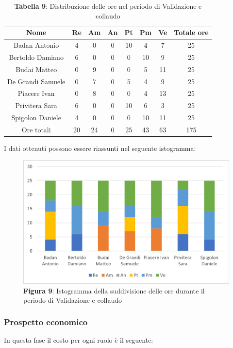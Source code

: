\begin{table}[H]
	\centering
	\renewcommand{\arraystretch}{1.5}
	\begin{tabular}{|c|c|c|c|c|c|c|c|}
		\hline
		\rowcolor{lighter-grayer}
		Nome & Re & Am & An & Pt & Pm & Ve & Totale ore\\
		\hline
		Badan Antonio & 4 & 0 & 0 &  10 & 4 & 7 & 25 \\
		\hline
		Bertoldo Damiano & 6 & 0 & 0 & 0 & 10 & 9 & 25 \\
		\hline
		Budai Matteo & 0 & 9 & 0 & 0 & 5 & 11 & 25 \\
		\hline
		De Grandi Samuele & 0 & 7 & 0 & 5 & 4 & 9 & 25 \\
		\hline
		Piacere Ivan & 0 & 8 & 0 & 0 & 4 & 13 & 25 \\
		\hline
		Privitera Sara & 6 & 0 & 0 & 10 & 6 & 3 & 25 \\
		\hline
		Spigolon Daniele & 4 & 0 & 0 & 0 & 10 & 11 & 25 \\
		\hline
		Ore totali & 20 & 24 & 0 & 25 & 43 & 63 & 175 \\
		\hline
	\end{tabular}
	\caption*{\textbf{Tabella 9}: Distribuzione delle ore nel periodo di Validazione e collaudo\\}
\end{table}	
	I dati ottenuti possono essere riassunti nel seguente istogramma:

\begin{figure}[H]
	\centering
	\includegraphics[width=0.7\linewidth]{res/images/Figura11.png}
	\caption*{\textbf{Figura 9}: Istogramma della suddivisione delle ore durante il periodo di Validazione e collaudo}
	\label{fig:Figura10}
\end{figure}
	
	
\subsubsection{Prospetto economico}
In questa fase il costo per ogni ruolo è il seguente:

